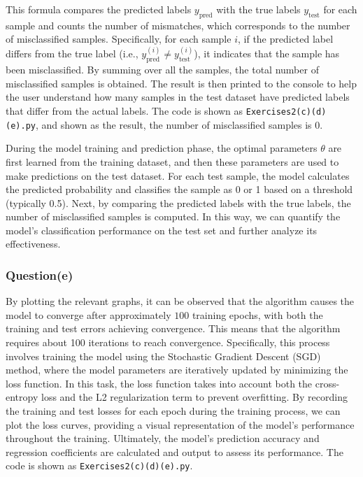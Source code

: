 \documentclass[a4paper, utf8]{ctexart}
\begin{document}
	This formula compares the predicted labels $ y_{\text{pred}} $ with the true labels $ y_{\text{test}} $ for each sample and counts the number of mismatches, which corresponds to the number of misclassified samples. Specifically, for each sample $ i $, if the predicted label differs from the true label (i.e., $ y_{\text{pred}}^{(i)} \neq y_{\text{test}}^{(i)} $), it indicates that the sample has been misclassified. By summing over all the samples, the total number of misclassified samples is obtained. The result is then printed to the console to help the user understand how many samples in the test dataset have predicted labels that differ from the actual labels. The code is shown as \verb|Exercises2(c)(d)(e).py|, and shown as the result, the number of misclassified samples is 0.
	
	During the model training and prediction phase, the optimal parameters $ \theta $ are first learned from the training dataset, and then these parameters are used to make predictions on the test dataset. For each test sample, the model calculates the predicted probability and classifies the sample as 0 or 1 based on a threshold (typically 0.5). Next, by comparing the predicted labels with the true labels, the number of misclassified samples is computed. In this way, we can quantify the model's classification performance on the test set and further analyze its effectiveness.
	
	\subsubsection{Question(e)}
	
	By plotting the relevant graphs, it can be observed that the algorithm causes the model to converge after approximately $100$ training epochs, with both the training and test errors achieving convergence. This means that the algorithm requires about 100 iterations to reach convergence. Specifically, this process involves training the model using the Stochastic Gradient Descent (SGD) method, where the model parameters are iteratively updated by minimizing the loss function. In this task, the loss function takes into account both the cross-entropy loss and the L2 regularization term to prevent overfitting. By recording the training and test losses for each epoch during the training process, we can plot the loss curves, providing a visual representation of the model's performance throughout the training. Ultimately, the model's prediction accuracy and regression coefficients are calculated and output to assess its performance. The code is shown as \verb|Exercises2(c)(d)(e).py|.
\end{document}
